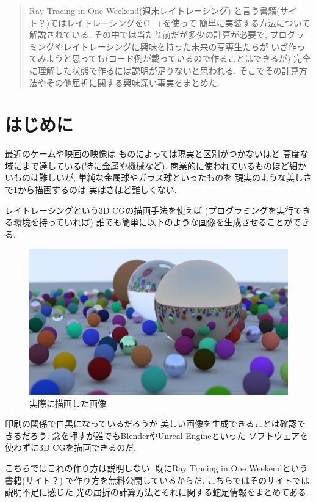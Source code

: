 \documentclass[a4paper, xelatex, ja=standard]{bxjsarticle}
\begin{document}
\maketitle
\begin{abstract}
Ray Tracing in One Weekend(週末レイトレーシング)
と言う書籍(サイト？)ではレイトレーシングをC++を使って
簡単に実装する方法について解説されている.
その中では当たり前だが多少の計算が必要で,
プログラミングやレイトレーシングに興味を持った未来の高専生たちが
いざ作ってみようと思っても(コード例が載っているので作ることはできるが)
完全に理解した状態で作るには説明が足りないと思われる.
そこでその計算方法やその他屈折に関する興味深い事実をまとめた.
\end{abstract}

\section{はじめに}
最近のゲームや映画の映像は
ものによっては現実と区別がつかないほど
高度な域にまで達している(特に金属や機械など).
商業的に使われているものほど細かいものは難しいが,
単純な金属球やガラス球といったものを
現実のような美しさで1から描画するのは
実はさほど難しくない.

レイトレーシングという3D CGの描画手法を使えば
(プログラミングを実行できる環境を持っていれば)
誰でも簡単に以下のような画像を生成させることができる.
\begin{figure}[b]
\centering
\includegraphics[scale=0.2]{img/example.png}
\caption{実際に描画した画像}
\label{}
\end{figure}
印刷の関係で白黒になっているだろうが
美しい画像を生成できることは確認できるだろう.
念を押すが誰でもBlenderやUnreal Engineといった
ソフトウェアを使わずに3D CGを描画できるのだ.

こちらではこれの作り方は説明しない.
既にRay Tracing in One Weekendという書籍(サイト？)
で作り方を無料公開しているからだ.
こちらではそのサイトでは説明不足に感じた
光の屈折の計算方法とそれに関する蛇足情報をまとめてある.
\end{document}

